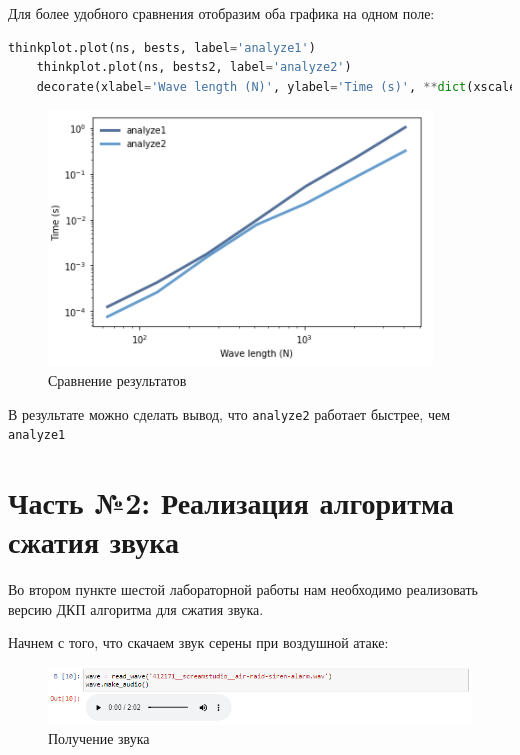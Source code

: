 \documentclass[a4paper]{article}
\begin{document}
            Для более удобного сравнения отобразим оба графика на одном поле:
            
\begin{lstlisting}[language=Python, caption= Сравнение результатов]
    thinkplot.plot(ns, bests, label='analyze1')
    thinkplot.plot(ns, bests2, label='analyze2')
    decorate(xlabel='Wave length (N)', ylabel='Time (s)', **dict(xscale='log', yscale='log'))
\end{lstlisting}               
            
            \begin{figure}[H]
                \centering
                \includegraphics{ex_1_comparison .png}
                \caption{Сравнение результатов}
                \label{fig:ex_1_comparison}
            \end{figure}
            
            В результате можно сделать вывод, что \texttt{analyze2} работает быстрее, чем \\ \texttt{analyze1}
    
    \newpage
        \section{Часть №2: Реализация алгоритма сжатия звука}
            Во втором пункте шестой лабораторной работы нам необходимо реализовать версию ДКП алгоритма для сжатия звука.
            
            Начнем с того, что скачаем звук серены при воздушной атаке:
            
             \begin{figure}[H]
                \centering
                \includegraphics[width=\textwidth]{ex_2_audio.png}
                \caption{Получение звука}
                \label{fig:ex_2_audio}
            \end{figure}
            
\end{document}
